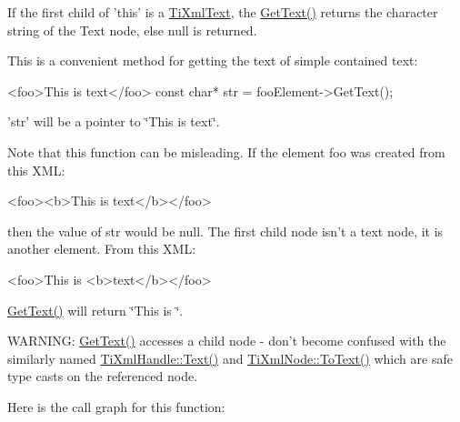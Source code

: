 \-If the first child of 'this' is a \hyperlink{class_ti_xml_text}{\-Ti\-Xml\-Text}, the \hyperlink{class_ti_xml_element_aa6dedd8a146acf3b1bc0903deb2d411a}{\-Get\-Text()} returns the character string of the \-Text node, else null is returned.

\-This is a convenient method for getting the text of simple contained text\-: \begin{DoxyVerb}
        	<foo>This is text</foo>
        	const char* str = fooElement->GetText();
        	\end{DoxyVerb}


'str' will be a pointer to \char`\"{}\-This is text\char`\"{}.

\-Note that this function can be misleading. \-If the element foo was created from this \-X\-M\-L\-: \begin{DoxyVerb}
        	<foo><b>This is text</b></foo>
        	\end{DoxyVerb}


then the value of str would be null. \-The first child node isn't a text node, it is another element. \-From this \-X\-M\-L\-: \begin{DoxyVerb}
        	<foo>This is <b>text</b></foo>
        	\end{DoxyVerb}
 \hyperlink{class_ti_xml_element_aa6dedd8a146acf3b1bc0903deb2d411a}{\-Get\-Text()} will return \char`\"{}\-This is \char`\"{}.

\-W\-A\-R\-N\-I\-N\-G\-: \hyperlink{class_ti_xml_element_aa6dedd8a146acf3b1bc0903deb2d411a}{\-Get\-Text()} accesses a child node -\/ don't become confused with the similarly named \hyperlink{class_ti_xml_handle_a9fc739c8a18d160006f82572fc143d13}{\-Ti\-Xml\-Handle\-::\-Text()} and \hyperlink{class_ti_xml_node_a3ddfbcac78fbea041fad57e5c6d60a03}{\-Ti\-Xml\-Node\-::\-To\-Text()} which are safe type casts on the referenced node. 

\-Here is the call graph for this function\-:


